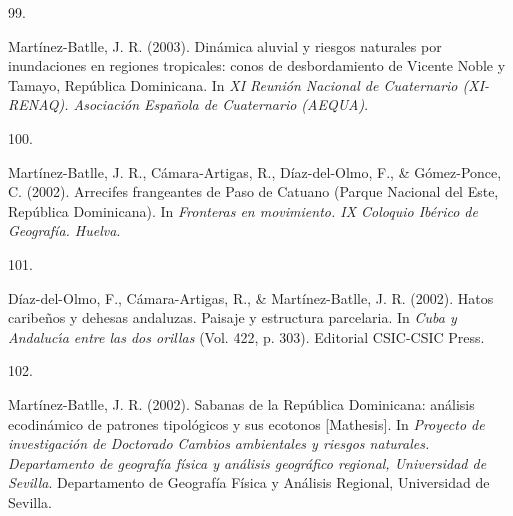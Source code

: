 \documentclass[10pt,a4paper,]{article}
\newlength{\cslhangindent}
\newlength{\csllabelwidth}
\newcommand{\CSLLeftMargin}[1]{\parbox[t]{\csllabelwidth}{\hfill #1~}}
\newcommand{\CSLRightInline}[1]{\parbox[t]{\linewidth - \cslhangindent - \csllabelwidth}{#1}\vspace{0.8ex}}
\begin{document}
\leavevmode\hypertarget{ref-Jose_Ramon_Martinez-Batlle_108103180}{}%
\CSLLeftMargin{99. }
\CSLRightInline{Martínez-Batlle, J. R. (2003). Dinámica aluvial y
riesgos naturales por inundaciones en regiones tropicales: conos de
desbordamiento de Vicente Noble y Tamayo, República Dominicana. In
\emph{XI Reunión Nacional de Cuaternario (XI-RENAQ). Asociación Española
de Cuaternario (AEQUA)}.}

\leavevmode\hypertarget{ref-Jose_Ramon_Martinez-Batlle_108103244}{}%
\CSLLeftMargin{100. }
\CSLRightInline{Martínez-Batlle, J. R., Cámara-Artigas, R.,
Díaz-del-Olmo, F., \& Gómez-Ponce, C. (2002). Arrecifes frangeantes de
Paso de Catuano (Parque Nacional del Este, República Dominicana). In
\emph{Fronteras en movimiento. IX Coloquio Ibérico de Geografía.
Huelva}.}

\leavevmode\hypertarget{ref-del2002hatos}{}%
\CSLLeftMargin{101. }
\CSLRightInline{Díaz-del-Olmo, F., Cámara-Artigas, R., \&
Martínez-Batlle, J. R. (2002). Hatos caribeños y dehesas andaluzas.
Paisaje y estructura parcelaria. In \emph{Cuba y Andalucı́a entre las dos
orillas} (Vol. 422, p. 303). Editorial CSIC-CSIC Press.}

\leavevmode\hypertarget{ref-martinez2002sabanas}{}%
\CSLLeftMargin{102. }
\CSLRightInline{Martínez-Batlle, J. R. (2002). Sabanas de la República
Dominicana: análisis ecodinámico de patrones tipológicos y sus ecotonos
{[}Mathesis{]}. In \emph{Proyecto de investigación de Doctorado Cambios
ambientales y riesgos naturales. Departamento de geografía física y
análisis geográfico regional, Universidad de Sevilla}. Departamento de
Geografía Física y Análisis Regional, Universidad de Sevilla.}
\end{document}
